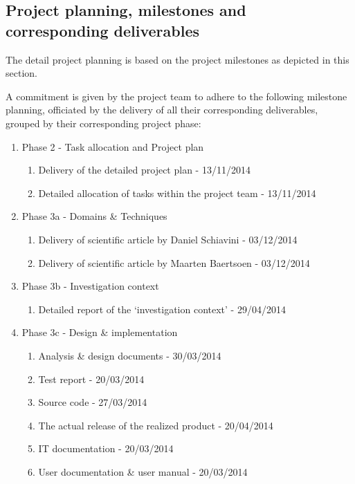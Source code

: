 \subsection{Project planning, milestones and corresponding deliverables}
\label{subsec:planning-milestones-deliverables}
The detail project planning is based on the project milestones as depicted in this section.

A commitment is given by the project team to adhere to the following milestone planning, officiated by the delivery of all their corresponding deliverables, grouped by their corresponding project phase:

 \begin{enumerate}
	\item Phase 2 - Task allocation and Project plan
 	\begin{enumerate}
		\item Delivery of the detailed project plan 			-	13/11/2014
		\item Detailed allocation of tasks within the project team 	- 	13/11/2014
	\end {enumerate}
	\item Phase 3a - Domains \& Techniques
 	\begin{enumerate}
		\item Delivery of scientific article by Daniel Schiavini		- 	03/12/2014
		\item Delivery of scientific article by Maarten Baertsoen		- 	03/12/2014
	\end {enumerate}
 	\item Phase 3b - Investigation context
 	\begin{enumerate}
		\item Detailed report of the `investigation context'  		- 	29/04/2014
	\end {enumerate}
 	\item Phase 3c - Design \& implementation
 	\begin{enumerate}
		\item Analysis \& design documents  				- 	30/03/2014
		\item Test report  							- 	20/03/2014
		\item Source code  							- 	27/03/2014
		\item The actual release of the realized product  		- 	20/04/2014
		\item IT documentation  						- 	20/03/2014
		\item User documentation \& user manual  			- 	20/03/2014
	\end {enumerate}

\end{enumerate}
